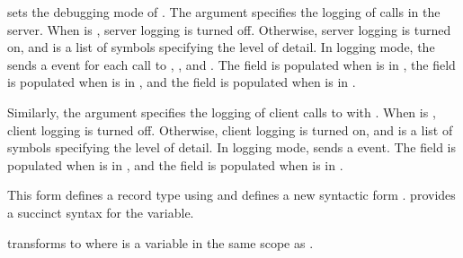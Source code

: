 \begin{procedure}
\end{procedure}
\returns{} 

\begin{argtbl}
\end{argtbl}

 sets the debugging mode of .
The  argument specifies the logging of calls in
the server. When  is , server logging
is turned off. Otherwise, server logging is turned on, and
 is a list of symbols specifying the level of
detail.  In logging mode, the  sends a
 event for each call to
, , and
. The  field is populated when
 is in , the  field is
populated when  is in , and the
 field is populated when  is in
.

Similarly, the  argument specifies the logging of
client calls to  with .  When
 is , client logging is turned
off. Otherwise, client logging is turned on, and 
is a list of symbols specifying the level of detail. In logging mode,
 sends a 
event. The  field is populated when  is
in , and the  field is populated when
 is in .

\begin{syntax}
\end{syntax}

This form defines a record type using  and defines a new syntactic form
.  provides a succinct syntax for the
 variable.

 transforms 
to  where
 is a variable in the same scope as .

